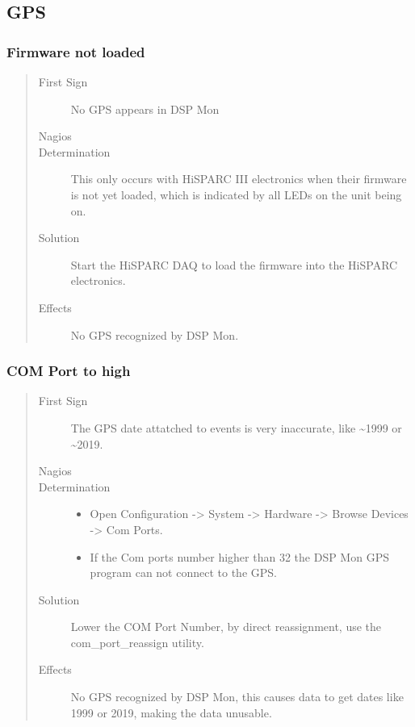 \documentclass[a4paper,11pt,english]{sphinxmanual}
\begin{document}
\subsection{GPS}
\label{known-issues:gps}

\subsubsection{Firmware not loaded}
\label{known-issues:firmware-not-loaded}\begin{quote}\begin{description}
\item[{First Sign}] \leavevmode
No GPS appears in DSP Mon

\item[{Nagios}] \leavevmode
\item[{Determination}] \leavevmode
This only occurs with HiSPARC III electronics when
their firmware is not yet loaded, which is indicated by
all LEDs on the unit being on.

\item[{Solution}] \leavevmode
Start the HiSPARC DAQ to load the firmware into the
HiSPARC electronics.

\item[{Effects}] \leavevmode
No GPS recognized by DSP Mon.

\end{description}\end{quote}


\subsubsection{COM Port to high}
\label{known-issues:com-port-to-high}\begin{quote}\begin{description}
\item[{First Sign}] \leavevmode
The GPS date attatched to events is very inaccurate, like
\textasciitilde{}1999 or \textasciitilde{}2019.

\item[{Nagios}] \leavevmode
\item[{Determination}] \leavevmode\begin{itemize}
\item {} 
Open Configuration -\textgreater{} System -\textgreater{} Hardware -\textgreater{} Browse Devices -\textgreater{} Com
Ports.

\item {} 
If the Com ports number higher than 32 the DSP Mon GPS program can
not connect to the GPS.

\end{itemize}

\item[{Solution}] \leavevmode
Lower the COM Port Number, by direct reassignment, use the
com\_port\_reassign utility.

\item[{Effects}] \leavevmode
No GPS recognized by DSP Mon, this causes data to get dates
like 1999 or 2019, making the data unusable.

\end{description}\end{quote}
\end{document}
